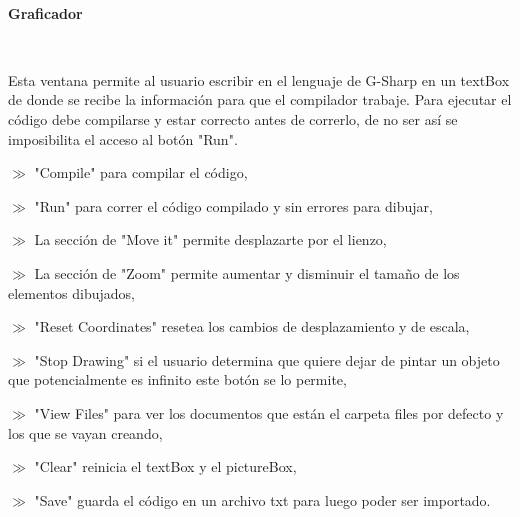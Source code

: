 \documentclass{article}
\begin{document}
\

\begin{center}
	\large\textbf{Graficador}
\end{center}

\

Esta ventana permite al usuario escribir en el lenguaje de G-Sharp en un textBox de donde se recibe la información para 
que el compilador trabaje. Para ejecutar el código debe compilarse y estar correcto antes de correrlo, de no ser así se 
imposibilita el acceso al botón "Run".


$\gg$ "Compile" para compilar el código, 


$\gg$ "Run" para correr el código compilado y sin errores para dibujar, 


$\gg$ La sección de "Move it" permite desplazarte por el lienzo,


$\gg$ La sección de "Zoom" permite aumentar y disminuir el tamaño de los elementos dibujados, 


$\gg$ "Reset Coordinates" resetea los cambios de desplazamiento y de escala, 


$\gg$ "Stop Drawing" si el usuario determina que quiere dejar de pintar un objeto que potencialmente es infinito este botón se lo permite,


$\gg$ "View Files" para ver los documentos que están el carpeta files por defecto y los que se vayan creando, 


$\gg$ "Clear" reinicia el textBox y el pictureBox, 


$\gg$ "Save" guarda el código en un archivo txt para luego poder ser importado.
\end{document}
